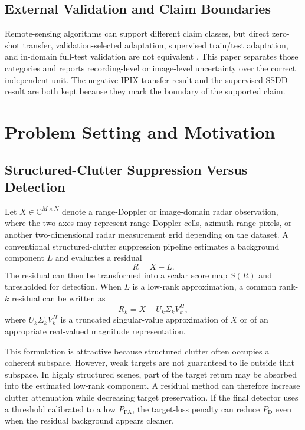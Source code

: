 \documentclass[journal]{IEEEtran}
\begin{document}
\subsection{External Validation and Claim Boundaries}

Remote-sensing algorithms can support different claim classes, but direct zero-shot transfer, validation-selected adaptation, supervised train/test adaptation, and in-domain full-test validation are not equivalent \cite{tuia2016domain}. This paper separates those categories and reports recording-level or image-level uncertainty over the correct independent unit. The negative IPIX transfer result and the supervised SSDD result are both kept because they mark the boundary of the supported claim.

\section{Problem Setting and Motivation}

\subsection{Structured-Clutter Suppression Versus Detection}

Let $X \in \mathbb{C}^{M \times N}$ denote a range-Doppler or image-domain radar observation, where the two axes may represent range-Doppler cells, azimuth-range pixels, or another two-dimensional radar measurement grid depending on the dataset. A conventional structured-clutter suppression pipeline estimates a background component $L$ and evaluates a residual
\begin{equation}
    R = X - L .
\end{equation}
The residual can then be transformed into a scalar score map $S(R)$ and thresholded for detection. When $L$ is a low-rank approximation, a common rank-$k$ residual can be written as
\begin{equation}
    R_k = X - U_k \Sigma_k V_k^{H},
\end{equation}
where $U_k \Sigma_k V_k^{H}$ is a truncated singular-value approximation of $X$ or of an appropriate real-valued magnitude representation.

This formulation is attractive because structured clutter often occupies a coherent subspace. However, weak targets are not guaranteed to lie outside that subspace. In highly structured scenes, part of the target return may be absorbed into the estimated low-rank component. A residual method can therefore increase clutter attenuation while decreasing target preservation. If the final detector uses a threshold calibrated to a low $P_{\mathrm{FA}}$, the target-loss penalty can reduce $P_{\mathrm{D}}$ even when the residual background appears cleaner.
\end{document}
